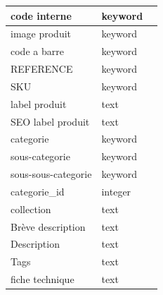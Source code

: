 \begin{longtable}{|l|l|p{5cm}|}
	\hline
	code interne                                 & keyword                 &                                            \\ \hline
	image produit                                & keyword                 &                                            \\ \hline
	code a barre                                 & keyword                 &                                            \\  \hline
	REFERENCE                                    & keyword                 &                                            \\ \hline
	SKU                                          & keyword                 &                                            \\ \hline
	label produit                                & text                    &                                            \\ \hline
	SEO label produit                            & text                    &                                            \\ \hline
	categorie                                    & keyword                 &                                            \\ \hline
	sous-categorie                               & keyword                 &                                            \\ \hline
	sous-sous-categorie                          & keyword                 &                                            \\ \hline
	categorie\_id                                & integer                 &                                            \\ \hline
	collection                                   & text                    &                                            \\ \hline
	Brève description                            & text                    &                                            \\ \hline
	Description                                  & text                    &                                            \\ \hline
	Tags                                         & text                    &                                            \\ \hline
	fiche technique                              & text                    &                                            \\ \hline

\end{longtable}
